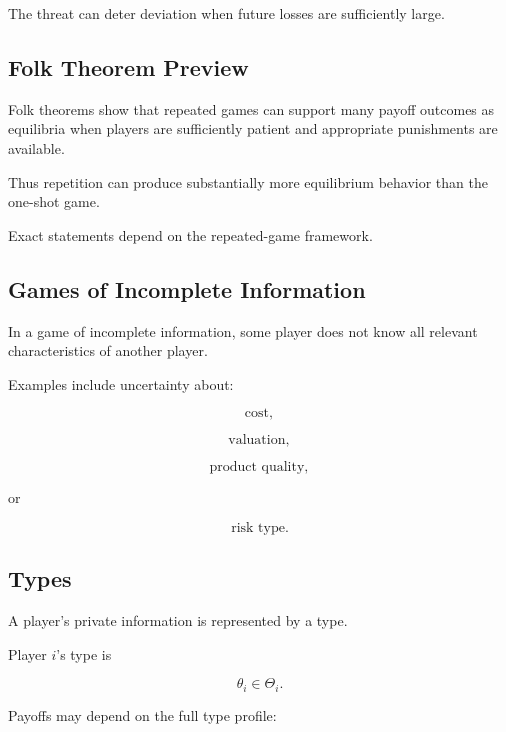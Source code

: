 The threat can deter deviation when future losses are sufficiently large.

\subsection{Folk Theorem Preview}
\label{subsec:folk-theorem-preview}

Folk theorems show that repeated games can support many payoff outcomes as
equilibria when players are sufficiently patient and appropriate
punishments are available.

Thus repetition can produce substantially more equilibrium behavior than
the one-shot game.

Exact statements depend on the repeated-game framework.

\subsection{Games of Incomplete Information}
\label{subsec:incomplete-information-games}

In a game of incomplete information, some player does not know all relevant
characteristics of another player.

Examples include uncertainty about:

\[
\boxed{
\text{cost},
}
\]

\[
\boxed{
\text{valuation},
}
\]

\[
\boxed{
\text{product quality},
}
\]

or

\[
\boxed{
\text{risk type}.
}
\]

\subsection{Types}
\label{subsec:game-theory-types}

A player's private information is represented by a type.

Player \(i\)'s type is

\[
\boxed{
\theta_i\in\Theta_i.
}
\]

Payoffs may depend on the full type profile:

